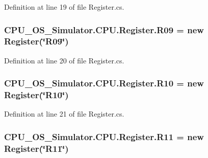 Definition at line 19 of file Register.\+cs.

\hypertarget{class_c_p_u___o_s___simulator_1_1_c_p_u_1_1_register_a6d88d738c0794179adbe47a73359b769}{}
\subsubsection[{R09}]{ C\+P\+U\+\_\+\+O\+S\+\_\+\+Simulator.\+C\+P\+U.\+Register.\+R09 = new {\bf Register}(\char`\"{}R09\char`\"{})\hspace{0.3cm}{\ttfamily [static]}}\label{class_c_p_u___o_s___simulator_1_1_c_p_u_1_1_register_a6d88d738c0794179adbe47a73359b769}


Definition at line 20 of file Register.\+cs.

\hypertarget{class_c_p_u___o_s___simulator_1_1_c_p_u_1_1_register_aafde355f621c35a2994b26ac1ad8c61b}{}
\subsubsection[{R10}]{ C\+P\+U\+\_\+\+O\+S\+\_\+\+Simulator.\+C\+P\+U.\+Register.\+R10 = new {\bf Register}(\char`\"{}R10\char`\"{})\hspace{0.3cm}{\ttfamily [static]}}\label{class_c_p_u___o_s___simulator_1_1_c_p_u_1_1_register_aafde355f621c35a2994b26ac1ad8c61b}


Definition at line 21 of file Register.\+cs.

\hypertarget{class_c_p_u___o_s___simulator_1_1_c_p_u_1_1_register_a4f593c7d99a4e42966dea3749c07b79d}{}
\subsubsection[{R11}]{ C\+P\+U\+\_\+\+O\+S\+\_\+\+Simulator.\+C\+P\+U.\+Register.\+R11 = new {\bf Register}(\char`\"{}R11\char`\"{})\hspace{0.3cm}{\ttfamily [static]}}\label{class_c_p_u___o_s___simulator_1_1_c_p_u_1_1_register_a4f593c7d99a4e42966dea3749c07b79d}


